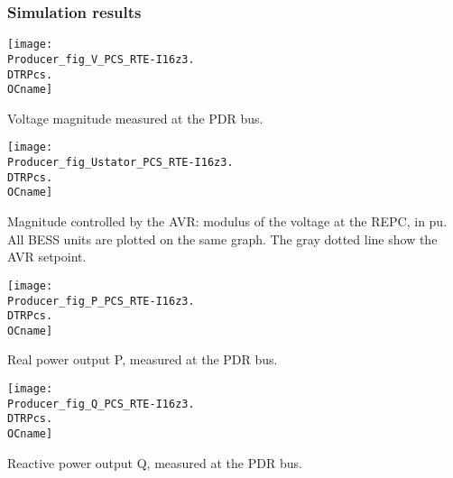     \subsubsection{Simulation results}
    \noindent
    \begin{minipage}[t]{0.48\textwidth}
        \centering
        \texttt{[image: \\Producer\_fig\_V\_PCS\_RTE-I16z3.\\DTRPcs.\\OCname]}
        \begin{minipage}[t]{0.8\textwidth}
            \small Voltage magnitude measured at the PDR bus.
        \end{minipage}
    \end{minipage}
    \hfill
    \begin{minipage}[t]{0.48\textwidth}
        \centering
        \texttt{[image: \\Producer\_fig\_Ustator\_PCS\_RTE-I16z3.\\DTRPcs.\\OCname]}
        \begin{minipage}[t]{0.8\textwidth}
            \small Magnitude controlled by the AVR: modulus of the voltage
            at the REPC, in pu. All BESS units are plotted on the same graph.
            The gray dotted line show the AVR setpoint.
        \end{minipage}
    \end{minipage}

    \vspace{0.5cm}
    \begin{minipage}[t]{0.48\textwidth}
        \centering
        \texttt{[image: \\Producer\_fig\_P\_PCS\_RTE-I16z3.\\DTRPcs.\\OCname]}
        \begin{minipage}[t]{0.8\textwidth}
            \small Real power output P, measured at the PDR bus.
        \end{minipage}
    \end{minipage}
    \hfill
    \begin{minipage}[t]{0.48\textwidth}
        \centering
        \texttt{[image: \\Producer\_fig\_Q\_PCS\_RTE-I16z3.\\DTRPcs.\\OCname]}
        \begin{minipage}[t]{0.8\textwidth}
            \small Reactive power output Q, measured at the PDR bus.
        \end{minipage}
    \end{minipage}

